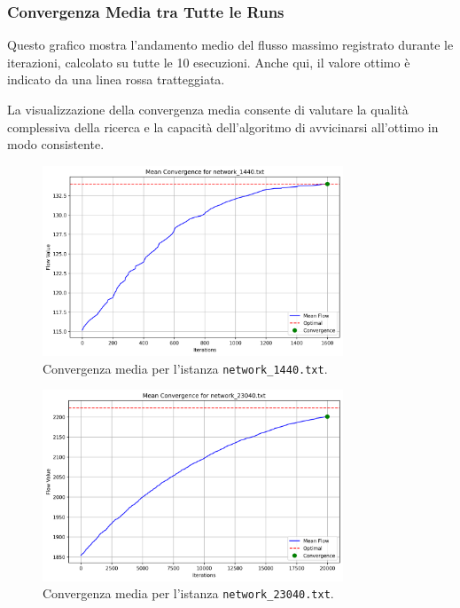 \documentclass[12pt,a4paper]{article}
\begin{document}
\subsubsection{Convergenza Media tra Tutte le Runs}

Questo grafico mostra l'andamento medio del flusso massimo registrato durante le iterazioni, calcolato su tutte le 10 esecuzioni. Anche qui, il valore ottimo è indicato da una linea rossa tratteggiata.

La visualizzazione della convergenza media consente di valutare la qualità complessiva della ricerca e la capacità dell’algoritmo di avvicinarsi all’ottimo in modo consistente.

\begin{figure}[H]
    \centering
    \includegraphics[width=0.8\textwidth]{results/network_1440_mean_convergence.png}
    \caption{Convergenza media per l'istanza \texttt{network\_1440.txt}.}
    \label{fig:mean_conv_1440}
\end{figure}

\begin{figure}[H]
    \centering
    \includegraphics[width=0.8\textwidth]{results/network_23040_mean_convergence.png}
    \caption{Convergenza media per l'istanza \texttt{network\_23040.txt}.}
    \label{fig:mean_conv_23040}
\end{figure}
\end{document}

